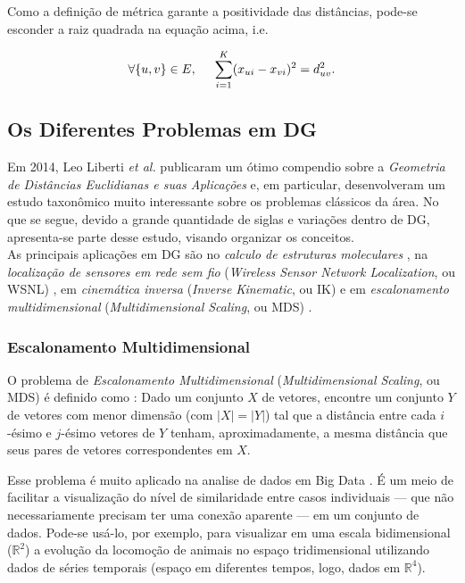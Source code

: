 Como a definição de métrica garante a positividade das distâncias, pode-se esconder a raiz quadrada na equação acima, i.e.

\begin{equation}
\forall \{u,v\} \in E, \hspace{0.5cm} \sum_{i=1}^{K}(x_{ui} - x_{vi})^2 = d_{uv}^2.
\label{eq:DGPSistemaQuadratico}
\end{equation}

\subsection{Os Diferentes Problemas em DG}

Em 2014, Leo Liberti \textit{et al.} publicaram um ótimo compendio sobre a \textit{Geometria de Distâncias Euclidianas e suas Aplicações} \cite{carlileGDandAplications} e, em particular, desenvolveram um estudo  taxonômico muito interessante sobre os problemas clássicos da área. No que se segue, devido a grande quantidade de siglas e variações dentro de DG, apresenta-se parte desse estudo, visando organizar os conceitos. 
\\

As principais aplicações em DG são no \textit{calculo de estruturas moleculares} \cite{crippen:DistancesAndMolecularConformation}, na \textit{localização de sensores em rede sem fio} (\textit{Wireless Sensor Network Localization}, ou WSNL) \cite{yemini1978positioning}, em \textit{cinemática inversa} (\textit{Inverse Kinematic}, ou IK) \cite{cinematicaInversa} e em \textit{escalonamento multidimensional} (\textit{Multidimensional Scaling}, ou MDS) \cite{multidimensionalScaling}.

\subsubsection{Escalonamento Multidimensional}

O problema de \textit{Escalonamento Multidimensional} (\textit{Multidimensional Scaling}, ou MDS)
é definido como \cite{carlileGDandAplications}: Dado um conjunto $X$ de vetores, encontre um conjunto $Y$ de vetores com menor dimensão (com $|X| = |Y|$) tal que a distância entre cada $i$-ésimo e $j$-ésimo vetores de $Y$ tenham, aproximadamente, a mesma distância que seus pares de vetores correspondentes em $X$.

Esse problema é muito aplicado na analise de dados em Big Data \cite{libertiEDG}. É um meio de facilitar a visualização do nível de similaridade entre casos individuais --- que não necessariamente precisam ter uma conexão aparente --- em um conjunto de dados. Pode-se usá-lo, por exemplo, para visualizar em uma escala bidimensional ($\mathbb{R}^2$) a evolução da locomoção de animais no espaço tridimensional utilizando dados de séries temporais (espaço em diferentes tempos, logo, dados em $\mathbb{R}^4$).

